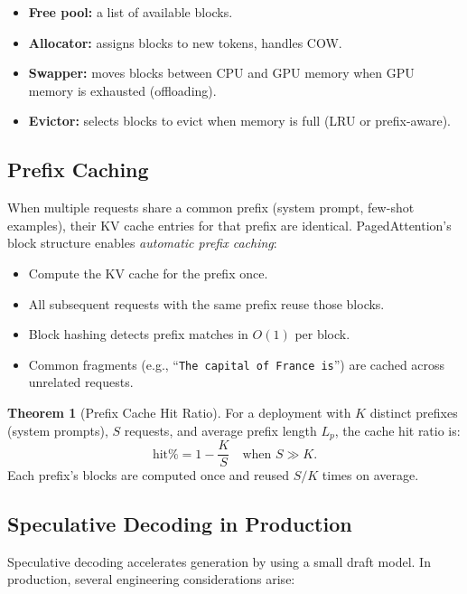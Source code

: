 \documentclass[11pt,a4paper]{article}
\theoremstyle{definition}
\newtheorem{theorem}{Theorem}[section]
\begin{document}
\begin{itemize}
	\item \textbf{Free pool:} a list of available blocks.
	\item \textbf{Allocator:} assigns blocks to new tokens, handles COW.
	\item \textbf{Swapper:} moves blocks between CPU and GPU memory when GPU memory is exhausted (offloading).
	\item \textbf{Evictor:} selects blocks to evict when memory is full (LRU or prefix-aware).
\end{itemize}

\subsection{Prefix Caching}

When multiple requests share a common prefix (system prompt, few-shot examples), their KV cache entries for that prefix are identical. PagedAttention's block structure enables \emph{automatic prefix caching}:

\begin{itemize}
	\item Compute the KV cache for the prefix once.
	\item All subsequent requests with the same prefix reuse those blocks.
	\item Block hashing detects prefix matches in $O(1)$ per block.
	\item Common fragments (e.g., ``\texttt{The capital of France is}'') are cached across unrelated requests.
\end{itemize}

\begin{theorem}[Prefix Cache Hit Ratio]
	For a deployment with $K$ distinct prefixes (system prompts), $S$ requests, and average prefix length $L_p$, the cache hit ratio is:
	\begin{equation}
		\text{hit\%} = 1 - \frac{K}{S} \quad \text{when } S \gg K.
	\end{equation}
	Each prefix's blocks are computed once and reused $S/K$ times on average.
\end{theorem}

\subsection{Speculative Decoding in Production}

Speculative decoding accelerates generation by using a small draft model. In production, several engineering considerations arise:
\end{document}
